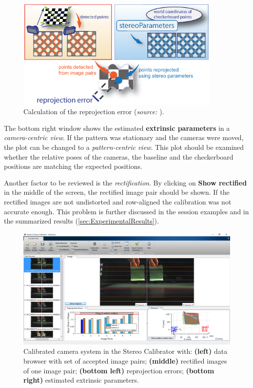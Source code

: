\begin{figure}[htbp]
		\centering
		\includegraphics[width=0.9\textwidth]{figures/ReprojectionError}
		\caption[Calculation of the reprojection error]{Calculation of the reprojection error (\textit{source:} \cite{StereoCalib.2016}).}
		\label{fig:ReprojectionError}
\end{figure}

The bottom right window shows the estimated \textbf{extrinsic parameters} in a \textit{camera-centric view}. If the pattern was stationary and the cameras were moved, the plot can be changed to a \textit{pattern-centric view}. This plot should be examined whether the relative poses of the cameras, the baseline and the checkerboard positions are matching the expected positions. 

Another factor to be reviewed is the \textit{rectification}. By clicking on \textbf{Show rectified} in the middle of the screen, the rectified image pair should be shown. If the rectified images are not undistorted and row-aligned the calibration was not accurate enough. This problem is further discussed in the session examples and in the summarized results (\autoref{sec:ExperimentalResults}).

\begin{figure}[htbp]
		\centering
		\includegraphics[width=1.0\textwidth]{figures/ExRectified}
		\caption[Calibrated camera system in Matlab]{Calibrated camera system in the Stereo Calibrator with: \textbf{(left)} data browser with set of accepted image pairs; \textbf{(middle)} rectified images of one image pair; \textbf{(bottom left)} reprojection errors; \textbf{(bottom right)} estimated extrinsic parameters.}
		\label{fig:ExRectified}
\end{figure}

